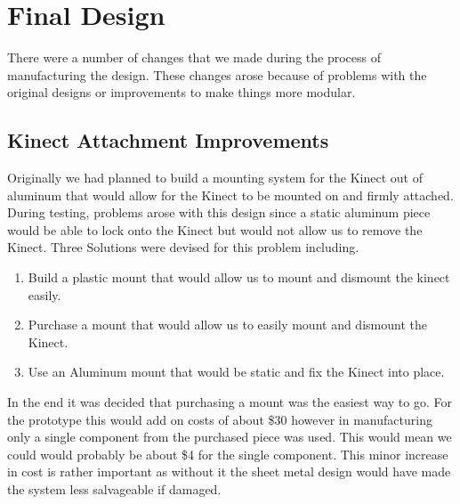 \documentclass[oneside,final,a4paper]{report}
\begin{document}
\section{Final Design}
There were a number of changes that we made during the process of manufacturing the design. These changes arose because of problems with the original designs or improvements to make things more modular. 
\subsection{Kinect Attachment Improvements}
Originally we had planned to build a mounting system for the Kinect out of aluminum that would allow for the Kinect to be mounted on and firmly attached. During testing, problems arose with this design since a static aluminum piece would be able to lock onto the Kinect but would not allow us to remove the Kinect. Three Solutions were devised for this problem including.
\begin{enumerate}
\item Build a plastic mount that would allow us to mount and dismount the kinect easily.
\item Purchase a mount that would allow us to easily mount and dismount the Kinect.
\item Use an Aluminum mount that would be static and fix the Kinect into place.
\end{enumerate}

In the end it was decided that purchasing a mount was the easiest way to go. For the prototype this would add on costs of about \$30 however in manufacturing only a single component from the purchased piece was used. This would mean we could would probably be about \$4 for the single component.  This minor increase in cost is rather important as without it the sheet metal design would have made the system less salvageable if damaged.
\end{document}
